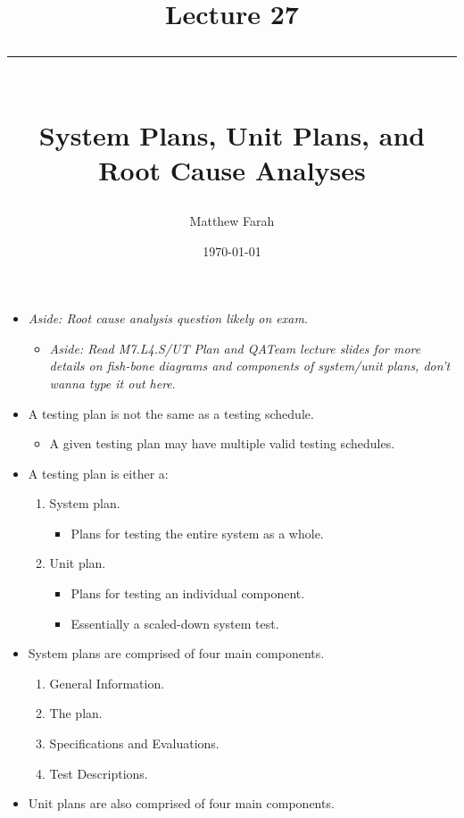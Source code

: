 \documentclass{article}
\date{
	\vspace{-.75em}
	{\large \today}
}
\title{
	\vspace*{-1.5em}
	{\Huge Lecture 27} \\
	\vspace{-1em}
	\rule{\textwidth/4}{.01em} \\
	\vspace{-.25em}
	{\Large System Plans, Unit Plans, and Root Cause Analyses}
	\vspace{-.75em}
}
\author{
	{\large Matthew Farah}
}
\begin{document}
\maketitle
\pagestyle{fancy}

\fi


\begin{itemize}
	\item \emph{Aside: Root cause analysis question likely on exam}.
	\begin{itemize}
		\item \emph{Aside: Read M7.L4.S/UT Plan and QATeam lecture slides for more details on fish-bone diagrams and components of system/unit plans, don't wanna type it out here}. \\
	\end{itemize}
	\item A testing plan is not the same as a testing schedule.
	\begin{itemize}
		\item A given testing plan may have multiple valid testing schedules.
	\end{itemize}
	\item A testing plan is either a:
	\begin{enumerate}
		\item System plan.
		\begin{itemize}
			\item Plans for testing the entire system as a whole.
		\end{itemize}
		\item Unit plan.
		\begin{itemize}
			\item Plans for testing an individual component.
			\item Essentially a scaled-down system test.
		\end{itemize}
	\end{enumerate}
	\item System plans are comprised of four main components.
	\begin{enumerate}
		\item General Information.
		\item The plan.
		\item Specifications and Evaluations.
		\item Test Descriptions.
	\end{enumerate}
	\item Unit plans are also comprised of four main components.

\end{itemize}
\end{document}
